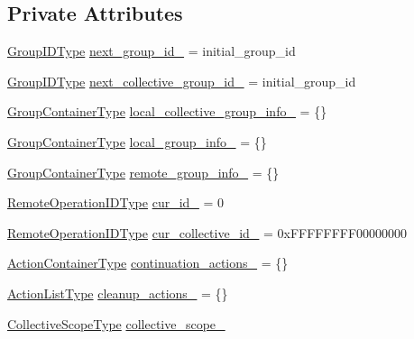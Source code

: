 \subsection*{Private Attributes}
\begin{DoxyCompactItemize}
\item 
\hyperlink{namespacevt_1_1group_a805a6643787ae841525c371fd0cefeb3}{Group\+I\+D\+Type} \hyperlink{structvt_1_1group_1_1_group_manager_ad14079e35fc22c1ddc8627f4f8bd2ffe}{next\+\_\+group\+\_\+id\+\_\+} = initial\+\_\+group\+\_\+id
\item 
\hyperlink{namespacevt_1_1group_a805a6643787ae841525c371fd0cefeb3}{Group\+I\+D\+Type} \hyperlink{structvt_1_1group_1_1_group_manager_a4e15169e16bc0c8d6fa1dd440c386e1b}{next\+\_\+collective\+\_\+group\+\_\+id\+\_\+} = initial\+\_\+group\+\_\+id
\item 
\hyperlink{structvt_1_1group_1_1_group_manager_a9e2a0989865f4097bb5edd390865555e}{Group\+Container\+Type} \hyperlink{structvt_1_1group_1_1_group_manager_a496d3a98cb37579f93815d4723c627f5}{local\+\_\+collective\+\_\+group\+\_\+info\+\_\+} = \{\}
\item 
\hyperlink{structvt_1_1group_1_1_group_manager_a9e2a0989865f4097bb5edd390865555e}{Group\+Container\+Type} \hyperlink{structvt_1_1group_1_1_group_manager_a90f8d0d19ae71493e3ef0f25cc33dc70}{local\+\_\+group\+\_\+info\+\_\+} = \{\}
\item 
\hyperlink{structvt_1_1group_1_1_group_manager_a9e2a0989865f4097bb5edd390865555e}{Group\+Container\+Type} \hyperlink{structvt_1_1group_1_1_group_manager_a970a1f928ab59533e256a30f1426ccee}{remote\+\_\+group\+\_\+info\+\_\+} = \{\}
\item 
\hyperlink{namespacevt_1_1group_a73f2624ddeb535b39a08b6524f26b244}{Remote\+Operation\+I\+D\+Type} \hyperlink{structvt_1_1group_1_1_group_manager_a3926aff931a66b46bcb1f4d2266986e4}{cur\+\_\+id\+\_\+} = 0
\item 
\hyperlink{namespacevt_1_1group_a73f2624ddeb535b39a08b6524f26b244}{Remote\+Operation\+I\+D\+Type} \hyperlink{structvt_1_1group_1_1_group_manager_aaa0fcab1d59372a1535f3b626a05db8a}{cur\+\_\+collective\+\_\+id\+\_\+} = 0x\+F\+F\+F\+F\+F\+F\+F\+F00000000
\item 
\hyperlink{structvt_1_1group_1_1_group_manager_af722b277e2ad6a8dacdfec0184cd8f2f}{Action\+Container\+Type} \hyperlink{structvt_1_1group_1_1_group_manager_a39b9b401f406e473eb073d59fb186e2c}{continuation\+\_\+actions\+\_\+} = \{\}
\item 
\hyperlink{structvt_1_1group_1_1_group_manager_a48b2dd05bbdda19c5d6195b8932a2716}{Action\+List\+Type} \hyperlink{structvt_1_1group_1_1_group_manager_a0b610e2592c927cbcd932322b4bde808}{cleanup\+\_\+actions\+\_\+} = \{\}
\item 
\hyperlink{structvt_1_1group_1_1_group_manager_a376be92b957fb33ac9b855f6d134ca6a}{Collective\+Scope\+Type} \hyperlink{structvt_1_1group_1_1_group_manager_a9d158b1541d5123ccbdecbfa7ce95dc1}{collective\+\_\+scope\+\_\+}
\end{DoxyCompactItemize}
